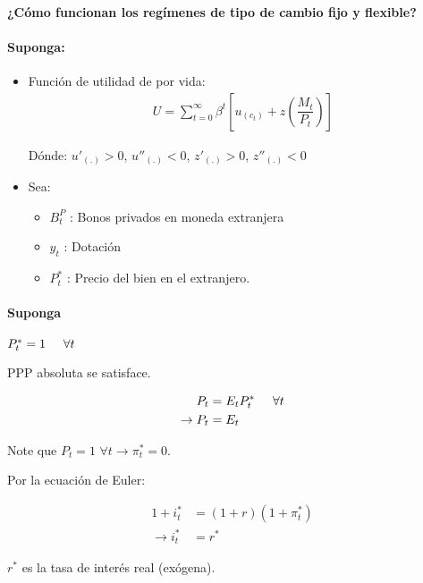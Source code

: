 \documentclass[8pt]{article}
\begin{document}
\paragraph*{¿Cómo funcionan los regímenes de tipo de cambio fijo y flexible?}

\paragraph*{Suponga:}

\begin{itemize}
    \item Función de utilidad de por vida:
    \begin{align}
        U = \sum_{t=0}^{\infty} \beta^t \left[u_{(c_t)} + z\left(\dfrac{M_t}{P_t}\right)\right]
    \end{align}
    
    Dónde: $u'_{(.)} > 0$, $u''_{(.)} < 0$, $z'_{(.)} > 0$, $z''_{(.)} < 0$
    
    \item Sea:
    
    \begin{itemize}
        \item $B_t^P$ : Bonos privados en moneda extranjera
        \item $y_t$ : Dotación
        \item $P_t^*$ : Precio del bien en el extranjero.
    \end{itemize}
    
\end{itemize}

\paragraph*{Suponga} $P_t^* = 1 \hspace*{0.5cm} \forall t$

PPP absoluta se satisface.

\begin{align}
    P_t &= E_tP_t^* \hspace*{0.5cm} \forall t \nonumber \\
    \rightarrow P_t &= E_t
\end{align}

Note que $P_t = 1 \,\, \forall t \rightarrow \pi_t^* = 0$.

Por la ecuación de Euler:

\begin{align}
    1+i_t^* &= (1+r)(1+\pi_t^*) \nonumber \\
    \rightarrow i_t^* &= r^*
\end{align}

$r^*$ es la tasa de interés real (exógena).
    


\end{document}
